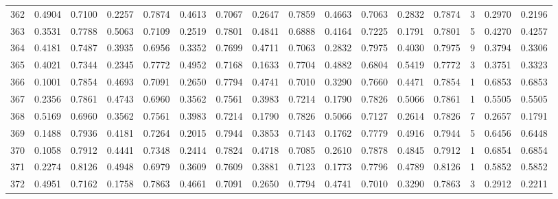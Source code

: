 \begin{tabular}{lrrrrrrrrrrrrrrr}
362 &      0.4904 &  0.7100 &  0.2257 &  0.7874 &  0.4613 &  0.7067 &  0.2647 &  0.7859 &  0.4663 &  0.7063 &   0.2832 &     0.7874 &      3 &                    0.2970 &                     0.2196 \\
363 &      0.3531 &  0.7788 &  0.5063 &  0.7109 &  0.2519 &  0.7801 &  0.4841 &  0.6888 &  0.4164 &  0.7225 &   0.1791 &     0.7801 &      5 &                    0.4270 &                     0.4257 \\
364 &      0.4181 &  0.7487 &  0.3935 &  0.6956 &  0.3352 &  0.7699 &  0.4711 &  0.7063 &  0.2832 &  0.7975 &   0.4030 &     0.7975 &      9 &                    0.3794 &                     0.3306 \\
365 &      0.4021 &  0.7344 &  0.2345 &  0.7772 &  0.4952 &  0.7168 &  0.1633 &  0.7704 &  0.4882 &  0.6804 &   0.5419 &     0.7772 &      3 &                    0.3751 &                     0.3323 \\
366 &      0.1001 &  0.7854 &  0.4693 &  0.7091 &  0.2650 &  0.7794 &  0.4741 &  0.7010 &  0.3290 &  0.7660 &   0.4471 &     0.7854 &      1 &                    0.6853 &                     0.6853 \\
367 &      0.2356 &  0.7861 &  0.4743 &  0.6960 &  0.3562 &  0.7561 &  0.3983 &  0.7214 &  0.1790 &  0.7826 &   0.5066 &     0.7861 &      1 &                    0.5505 &                     0.5505 \\
368 &      0.5169 &  0.6960 &  0.3562 &  0.7561 &  0.3983 &  0.7214 &  0.1790 &  0.7826 &  0.5066 &  0.7127 &   0.2614 &     0.7826 &      7 &                    0.2657 &                     0.1791 \\
369 &      0.1488 &  0.7936 &  0.4181 &  0.7264 &  0.2015 &  0.7944 &  0.3853 &  0.7143 &  0.1762 &  0.7779 &   0.4916 &     0.7944 &      5 &                    0.6456 &                     0.6448 \\
370 &      0.1058 &  0.7912 &  0.4441 &  0.7348 &  0.2414 &  0.7824 &  0.4718 &  0.7085 &  0.2610 &  0.7878 &   0.4845 &     0.7912 &      1 &                    0.6854 &                     0.6854 \\
371 &      0.2274 &  0.8126 &  0.4948 &  0.6979 &  0.3609 &  0.7609 &  0.3881 &  0.7123 &  0.1773 &  0.7796 &   0.4789 &     0.8126 &      1 &                    0.5852 &                     0.5852 \\
372 &      0.4951 &  0.7162 &  0.1758 &  0.7863 &  0.4661 &  0.7091 &  0.2650 &  0.7794 &  0.4741 &  0.7010 &   0.3290 &     0.7863 &      3 &                    0.2912 &                     0.2211 \\

\end{tabular}
